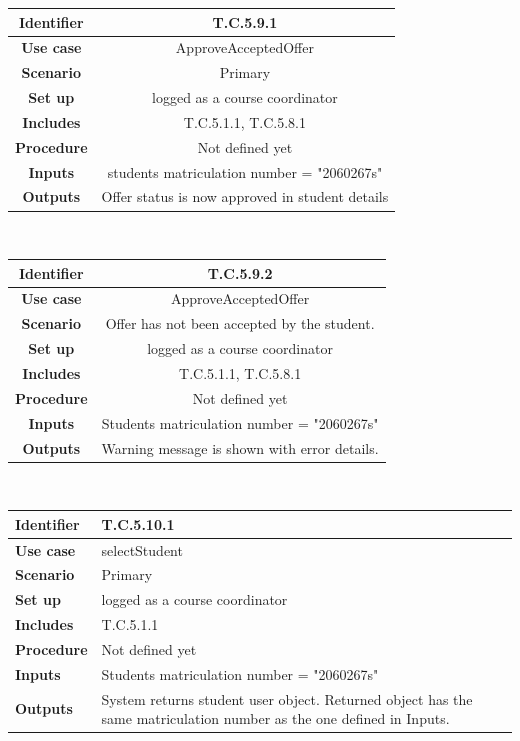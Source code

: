 \documentclass{l3deliverable}
\begin{document}
\begin{tabular}{|c|c|}
\hline \textbf{Identifier} & T.C.5.9.1\\
\hline \textbf{Use case} & ApproveAcceptedOffer\\
\hline \textbf{Scenario} & Primary\\
\hline \textbf{Set up} & logged as a course coordinator\\
\hline \textbf{Includes} & T.C.5.1.1, T.C.5.8.1\\
\hline \textbf{Procedure} & Not defined yet\\
\hline \textbf{Inputs} & students matriculation number = "2060267s"\\
\hline \textbf{Outputs} & Offer status is now approved in student details\\
\hline
\end{tabular}
\\
\begin{tabular}{|c|c|}
\hline \textbf{Identifier} & T.C.5.9.2\\
\hline \textbf{Use case} & ApproveAcceptedOffer\\
\hline \textbf{Scenario} & Offer has not been accepted by the student.\\
\hline \textbf{Set up} & logged as a course coordinator\\
\hline \textbf{Includes} & T.C.5.1.1, T.C.5.8.1\\
\hline \textbf{Procedure} & Not defined yet\\
\hline \textbf{Inputs} & Students matriculation number = "2060267s"\\
\hline \textbf{Outputs} & Warning message is shown with error details.\\
\hline
\end{tabular}
\\
\begin{tabular}{|p{2cm}|p{12cm}|}
\hline \textbf{Identifier} & T.C.5.10.1\\
\hline \textbf{Use case} & selectStudent\\
\hline \textbf{Scenario} & Primary\\
\hline \textbf{Set up} & logged as a course coordinator\\
\hline \textbf{Includes} & T.C.5.1.1\\
\hline \textbf{Procedure} & Not defined yet\\
\hline \textbf{Inputs} & Students matriculation number = "2060267s"\\
\hline \textbf{Outputs} & System returns student user object. Returned object has the same matriculation number as the one defined in Inputs.\\
\hline
\end{tabular}
\end{document}

